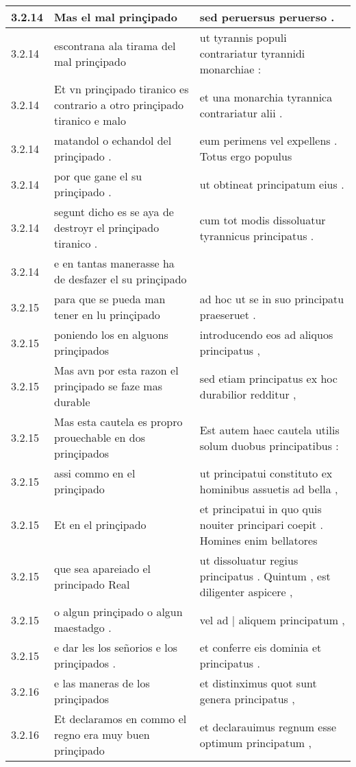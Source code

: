 \begin{tabular}{|p{1cm}|p{6.5cm}|p{6.5cm}|}
3.2.14 & Mas el mal prinçipado & sed peruersus peruerso . \\\hline
3.2.14 & escontrana ala tirama del mal prinçipado & ut tyrannis populi contrariatur tyrannidi monarchiae : \\\hline
3.2.14 & Et vn prinçipado tiranico es contrario a otro prinçipado tiranico e malo & et una monarchia tyrannica contrariatur alii . \\\hline
3.2.14 & matandol o echandol del prinçipado . & eum perimens vel expellens . Totus ergo populus \\\hline
3.2.14 & por que gane el su prinçipado . & ut obtineat principatum eius . \\\hline
3.2.14 & segunt dicho es se aya de destroyr el prinçipado tiranico . & cum tot modis dissoluatur tyrannicus principatus . \\\hline
3.2.14 & e en tantas manerasse ha de desfazer el su prinçipado &  \\\hline
3.2.15 & para que se pueda man tener en lu prinçipado & ad hoc ut se in suo principatu praeseruet . \\\hline
3.2.15 & poniendo los en alguons prinçipados & introducendo eos ad aliquos principatus , \\\hline
3.2.15 & Mas avn por esta razon el prinçipado se faze mas durable & sed etiam principatus ex hoc durabilior redditur , \\\hline
3.2.15 & Mas esta cautela es propro prouechable en dos prinçipados & Est autem haec cautela utilis solum duobus principatibus : \\\hline
3.2.15 & assi commo en el prinçipado & ut principatui constituto ex hominibus assuetis ad bella , \\\hline
3.2.15 & Et en el prinçipado & et principatui in quo quis nouiter principari coepit . Homines enim bellatores \\\hline
3.2.15 & que sea apareiado el principado Real & ut dissoluatur regius principatus . Quintum , est diligenter aspicere , \\\hline
3.2.15 & o algun prinçipado o algun maestadgo . & vel ad | aliquem principatum , \\\hline
3.2.15 & e dar les los señorios e los prinçipados . & et conferre eis dominia et principatus . \\\hline
3.2.16 & e las maneras de los prinçipados & et distinximus quot sunt genera principatus , \\\hline
3.2.16 & Et declaramos en commo el regno era muy buen prinçipado & et declarauimus regnum esse optimum principatum , \\\hline

\end{tabular}
